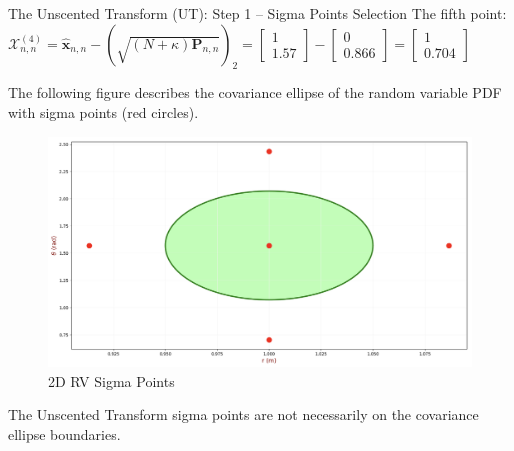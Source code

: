 \begin{frame}{The Unscented Transform (UT): Step 1 – Sigma Points Selection}
The fifth point: \(\mathcal{X}^{(4)}_{n,n} = \hat{\mathbf{x}}_{n,n} - \left(\sqrt{(N + \kappa)\mathbf{P}_{n,n}}\right)_2 = 
\begin{bmatrix}
1 \\
1.57
\end{bmatrix}
-
\begin{bmatrix}
0 \\
0.866
\end{bmatrix}
=
\begin{bmatrix}
1 \\
0.704
\end{bmatrix}
\)

The following figure describes the covariance ellipse of the random variable PDF
with sigma points (red circles).
\begin{figure}
    \centering
    \includegraphics[width=0.5\linewidth]{Figures//Part3/2DSigmaPoints_Example.png}
    \vspace{-10pt}
    \caption{2D RV Sigma Points}
    \vspace{-10pt}
\end{figure}
The Unscented Transform sigma points are not necessarily on the covariance ellipse
boundaries.
\end{frame}


